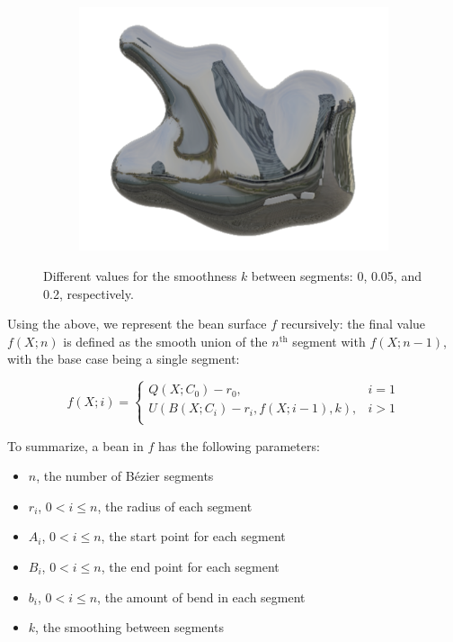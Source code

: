 \documentclass[%
reprint,
twocolumn,
nofootinbib,
 amsmath,amssymb,
 aps,
]{revtex4-2}
\begin{document}
\begin{figure}
\begin{subfigure}{0.15\textwidth}
        \includegraphics[width=0.98\linewidth]{img/smoothness0.2.png}
    \end{subfigure}
    \caption{Different values for the smoothness $k$ between segments: 0, 0.05, and 0.2, respectively.}
    \label{fig:smoothness}
\end{figure}

Using the above, we represent the bean surface $f$ recursively: the final value $f(X; n)$ is defined as the smooth union of the $n^\text{th}$ segment with $f(X; n-1)$, with the base case being a single segment:

\begin{equation}
    f(X; i) = \begin{cases}
        Q(X; C_0) - r_0, &i = 1\\
        U(B(X; C_i) - r_i, f(X; i-1), k), &i > 1\\
    \end{cases}
\end{equation}

To summarize, a bean in $f$ has the following parameters:

\begin{itemize}
    \item $n$, the number of B\'ezier segments
    \item $r_i$, $0 < i \le n$, the radius of each segment
    \item $A_i$, $0 < i \le n$, the start point for each segment
    \item $B_i$, $0 < i \le n$, the end point for each segment
    \item $b_i$, $0 < i \le n$, the amount of bend in each segment
    \item $k$, the smoothing between segments
\end{itemize}
\end{document}
